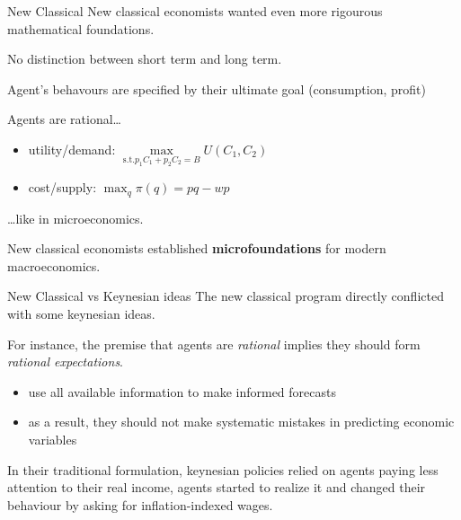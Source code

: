 \begin{frame}{New Classical}
\protect\hypertarget{new-classical-1}{}
New classical economists wanted even more rigourous mathematical
foundations.

No distinction between short term and long term.

Agent's behavours are specified by their ultimate goal (consumption,
profit)

Agents are rational\ldots{}

\begin{itemize}
\tightlist
\item
  utility/demand:
  \(\max\limits_{\text{s.t.} p_1 C_1 + p_2 C_2 = B} U(C_1, C_2)\)
\item
  cost/supply: \(\max_q π(q) = p q - w p\)
\end{itemize}

\ldots like in microeconomics.

New classical economists established \textbf{microfoundations} for
modern macroeconomics.
\end{frame}

\begin{frame}{New Classical vs Keynesian ideas}
\protect\hypertarget{new-classical-vs-keynesian-ideas}{}
The new classical program directly conflicted with some keynesian ideas.

For instance, the premise that agents are \emph{rational} implies they
should form \emph{rational expectations}.

\begin{itemize}
\tightlist
\item
  use all available information to make informed forecasts
\item
  as a result, they should not make systematic mistakes in predicting
  economic variables
\end{itemize}

In their traditional formulation, keynesian policies relied on agents
paying less attention to their real income, agents started to realize it
and changed their behaviour by asking for inflation-indexed wages.
\end{frame}

